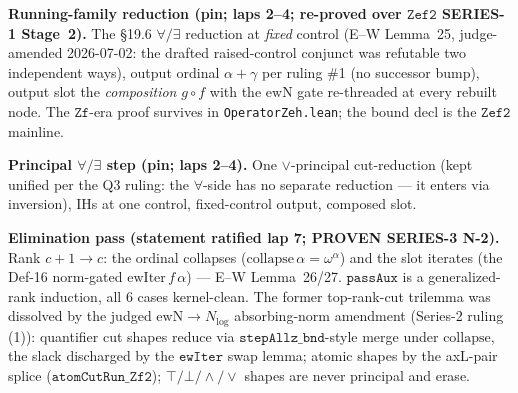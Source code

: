 \begin{theorem}\label{thm:zeh_reduction}
  \leanok
\textbf{Running-family reduction (pin; laps 2--4; re-proved over \(\mathtt{Zef2}\) SERIES-1
Stage~2).}  The \S19.6 \(\forall/\exists\) reduction at \emph{fixed} control (E--W Lemma~25,
judge-amended 2026-07-02: the drafted raised-control conjunct was refutable two independent ways),
output ordinal \(\alpha+\gamma\) per ruling \#1 (no successor bump), output slot the
\emph{composition} \(g\circ f\) with the \(\mathrm{ewN}\) gate re-threaded at every rebuilt node.
The \(\mathtt{Zf}\)-era proof survives in \texttt{OperatorZeh.lean}; the bound decl is the
\(\mathtt{Zef2}\) mainline.
\end{theorem}

\begin{theorem}\label{thm:zeh_step}
  \leanok
\textbf{Principal \(\forall/\exists\) step (pin; laps 2--4).}  One \(\vee\)-principal
cut-reduction (kept unified per the Q3 ruling: the \(\forall\)-side has no separate reduction ---
it enters via inversion), IHs at one control, fixed-control output, composed slot.
\end{theorem}

\begin{theorem}\label{thm:zeh_pass}
  \leanok
\textbf{Elimination pass (statement ratified lap 7; PROVEN SERIES-3 N-2).}
Rank \(c+1 \to c\): the ordinal collapses (\(\mathrm{collapse}\,\alpha = \omega^\alpha\)) and the
slot iterates (the Def-16 norm-gated \(\mathrm{ewIter}\,f\,\alpha\)) --- E--W Lemma~26/27.
\(\texttt{passAux}\) is a generalized-rank induction, all 6 cases kernel-clean.  The former
top-rank-cut trilemma was dissolved by the judged \(\mathrm{ewN}\to N_{\log}\) absorbing-norm
amendment (Series-2 ruling (1)): quantifier cut shapes reduce via
\(\texttt{stepAllz\_bnd}\)-style merge under \(\mathrm{collapse}\), the slack discharged by the
\(\texttt{ewIter}\) swap lemma; atomic shapes by the axL-pair splice
(\(\texttt{atomCutRun\_Zf2}\)); \(\top/\bot/\wedge/\vee\) shapes are never principal and erase.
\end{theorem}


